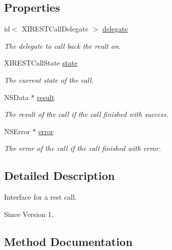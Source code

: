 \subsection*{Properties}
\begin{DoxyCompactItemize}
\item 
id$<$ X\+I\+R\+E\+S\+T\+Call\+Delegate $>$ \hyperlink{protocol_x_i_r_e_s_t_call_01-p_a5a8ef8749c07d609e217012db1c5051e}{delegate}
\begin{DoxyCompactList}\small\item\em The delegate to call back the reult on. \end{DoxyCompactList}\item 
X\+I\+R\+E\+S\+T\+Call\+State \hyperlink{protocol_x_i_r_e_s_t_call_01-p_a97493d9eebb0ebd6b0ccd33b92e2b32e}{state}
\begin{DoxyCompactList}\small\item\em The current state of the call. \end{DoxyCompactList}\item 
N\+S\+Data $\ast$ \hyperlink{protocol_x_i_r_e_s_t_call_01-p_a860f6b923f9cd9eb626e854e4f508df1}{result}
\begin{DoxyCompactList}\small\item\em The result of the call if the call finished with success. \end{DoxyCompactList}\item 
N\+S\+Error $\ast$ \hyperlink{protocol_x_i_r_e_s_t_call_01-p_af71a4319828a2e994a3e2360002f49d9}{error}
\begin{DoxyCompactList}\small\item\em The error of the call if the call finished with error. \end{DoxyCompactList}\end{DoxyCompactItemize}


\subsection{Detailed Description}
Interface for a rest call. 

\begin{DoxySince}{Since}
Version 1. 
\end{DoxySince}


\subsection{Method Documentation}
\hypertarget{protocol_x_i_r_e_s_t_call_01-p_a78d1e5fe3f553d13bf0fcba0adb07b74}{}\label{protocol_x_i_r_e_s_t_call_01-p_a78d1e5fe3f553d13bf0fcba0adb07b74} 
